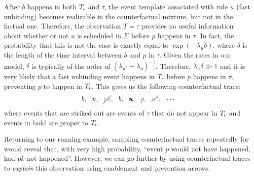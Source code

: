 After $b$ happens in both $T_\iota$ and $\tau$, the event template
associated with rule $u$ (fast unbinding) becomes realizable in the
counterfactual mixture, but not in the factual one. Therefore, the
observation $T\!=\!\tau$ provides no useful information about whether
or not $u$ is scheduled in $\Sigma$ before $p$ happens in $\tau$. In
fact, the probability that this is not the case is exactly equal to
$\exp(-\lambda_u\delta)$, where $\delta$ is the length of the time
interval between $b$ and $p$ in $\tau$. Given the rates in our model,
$\delta$ is typically of the order of
$(\lambda_{u^*}+\lambda_p)^{-1}$. Therefore, $\lambda_u\delta \gg 1$ and
it is very likely that a fast unbinding event happens in $T_\iota$
before $p$ happens in $\tau$, preventing $p$ to happen in $T_\iota$.
This gives us the following counterfactual trace:
\begin{align}
  \label{counterfactual-trace} 
  b,\ \ u,\ \ \strikeout{pk}, \ \ b, \ \ \pmb{u}, \ \ \strikeout{p}, 
  \ \ \strikeout{u^*}, \ \ \cdots
\end{align} 
where events that are striked out are events of $\tau$ that do not
appear in $T_\iota$ and events in bold are proper to $T_\iota$.

 


Returning to our running example, sampling counterfactual traces
repeatedly for \RefTrace{} would reveal that, with very high
probability, ``event $p$ would not have happened, had $pk$ not
happened''. However, we can go further by using counterfactual traces
to \textit{explain} this observation using enablement and prevention
arrows.
